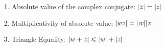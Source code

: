 {\begin{enumerate}[label=(\roman*)]
		\item Absolute value of the complex conjugate: \(\lvert\overline{z}\rvert = \lvert z\rvert\)


		\item Multiplicativity of absolute value: \(\lvert wz\rvert = \lvert w\rvert\lvert z\rvert\)

		\item Triangle Equality: \(\lvert w + z\rvert \leqslant \lvert w\rvert + \lvert z\rvert\)




\end{enumerate}}
